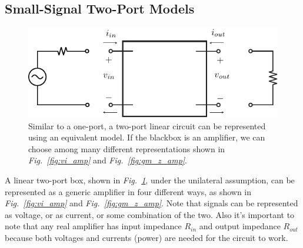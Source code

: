 \subsection{Small-Signal Two-Port Models}
\begin{figure}[tb]
\centering
\includegraphics[scale=1]{2port_ss}
\caption{Similar to a one-port, a two-port linear circuit can be represented using an equivalent model.  If the blackbox is an amplifier, we can choose among many different representations shown in \emph{Fig.~\ref{fig:vi_amp}} and \emph{Fig.~\ref{fig:gm_z_amp}}.}
\label{fig:2port_ss}
\end{figure}
A linear two-port box, shown in \emph{Fig.~\ref{fig:2port_ss}}, under the unilateral assumption, can be represented as a generic amplifier in four different ways, as shown in \emph{Fig.~\ref{fig:vi_amp}} and \emph{Fig.~\ref{fig:gm_z_amp}}.  Note that signals can be represented as voltage, or as current, or some combination of the two.  Also it's important to note that any real amplifier has input impedance $R_{in}$ and output impedance $R_{out}$ because both voltages and currents (power) are needed for the circuit to work.  
